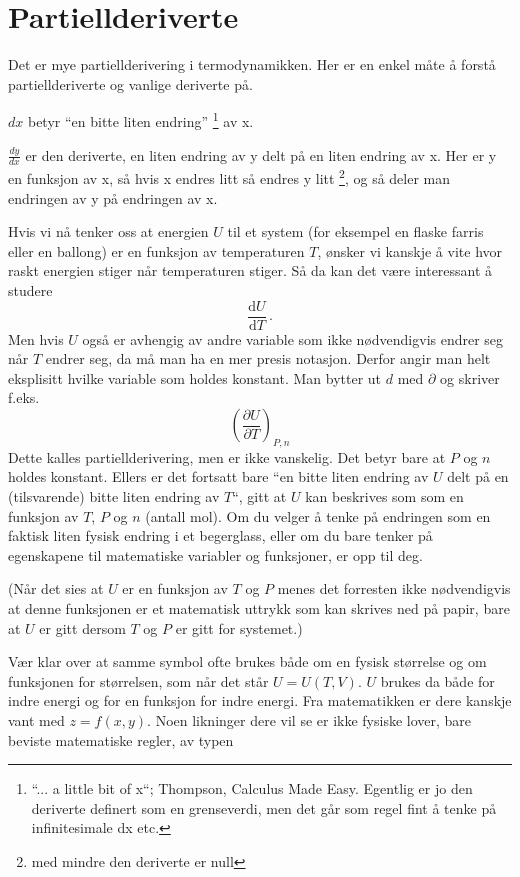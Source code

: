\documentclass[11pt, A4paper]{article}
\begin{document}
\section{Partiellderiverte}
Det er mye partiellderivering i termodynamikken. Her er en enkel måte å forstå partiellderiverte og vanlige deriverte på. 

$dx$ betyr ``en bitte liten endring'' \footnote{``... a little bit of x``; Thompson, Calculus Made Easy. Egentlig er jo den deriverte definert som en grenseverdi, men det går som regel fint å tenke på infinitesimale dx etc.} av x.

$\frac{dy}{dx}$ er den deriverte, en liten endring av y delt på en
liten endring av x. Her er y en funksjon av x, så hvis x endres
litt så endres y litt \footnote{med mindre den deriverte er null}, og så deler man endringen av y på endringen av x. 

Hvis vi nå tenker oss at energien $U$ til et system (for eksempel en flaske farris
eller en ballong) er en funksjon av temperaturen $T$, ønsker vi kanskje å vite
hvor raskt energien stiger når temperaturen stiger. Så da kan
det være interessant å studere
\begin{equation*}
\label{eq:16}
\frac{\mathrm{d}U}{\mathrm{d}T}\,.
\end{equation*}
Men hvis $U$ også er avhengig av andre variable som ikke nødvendigvis endrer seg når $T$ endrer seg, da må man ha en mer presis notasjon. Derfor  angir man helt
eksplisitt hvilke variable som holdes konstant. Man bytter ut $d$ med
$\partial$ og skriver f.eks.
\begin{equation*}
\label{eq:1}
\left(\frac{\partial U}{\partial T}\right)_{P,n}
\end{equation*}
Dette kalles partiellderivering, men er ikke vanskelig. Det betyr bare at $P$ og $n$ holdes konstant. Ellers er det fortsatt bare
``en bitte liten endring av $U$ delt på en (tilsvarende) bitte liten
endring av $T$``, gitt at $U$ kan beskrives som som en funksjon av
$T$, $P$ og $n$ (antall mol). Om du velger å tenke på endringen som en
faktisk liten fysisk endring i et begerglass, eller om du bare tenker
på egenskapene til matematiske variabler og funksjoner, er opp til
deg.

(Når det sies at $U$ er en funksjon av $T$ og $P$
menes det forresten ikke nødvendigvis at denne funksjonen er et matematisk uttrykk
som kan skrives ned på papir, bare at $U$ er gitt dersom $T$ og $P$
er gitt for systemet.)

Vær klar over at samme symbol ofte brukes både om en fysisk størrelse
og om funksjonen for størrelsen, som når det står $U = U(T, V)$. $U$
brukes da både for indre energi og for en funksjon for indre
energi. Fra matematikken er dere kanskje vant med $z = f(x, y)$. Noen
likninger dere vil se er ikke fysiske lover, bare beviste matematiske
regler, av typen
\end{document}
